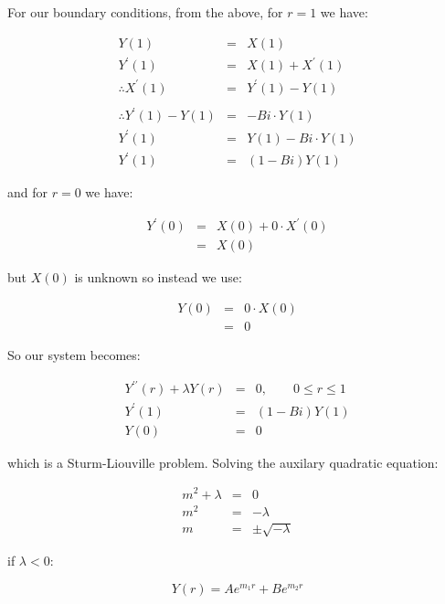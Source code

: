 \documentclass{report}
\begin{document}
For our boundary conditions, from the above, for $r = 1$ we have:\bigskip

\begin{eqnarray*} 
                           Y(1) & = & X(1) \\
                  Y^{\prime}(1) & = & X(1) + X^{\prime}(1) \\
       \therefore X^{\prime}(1) & = & Y^{\prime}(1) - Y(1) \\\\
\therefore Y^{\prime}(1) - Y(1) & = & -Bi \cdot Y(1) \\
                  Y^{\prime}(1) & = & Y(1) - Bi \cdot Y(1) \\
                  Y^{\prime}(1) & = & (1 - Bi)Y(1)
\end{eqnarray*}\medskip

and for $r = 0$ we have:\bigskip

\begin{eqnarray*} 
Y^{\prime}(0) & = & X(0) + 0 \cdot X^{\prime}(0) \\
              & = & X(0) 
\end{eqnarray*}\medskip

but $X(0)$ is unknown so instead we use:\bigskip

\begin{eqnarray*} 
Y(0) & = & 0 \cdot X(0) \\ 
     & = & 0 
\end{eqnarray*}\medskip

So our system becomes:\bigskip

\begin{eqnarray*} 
Y^{\prime\prime}(r) + \lambda Y(r) & = & 0, \qquad 0 \leq r \leq 1 \\
                     Y^{\prime}(1) & = & (1 - Bi)Y(1) \\
                              Y(0) & = & 0 
\end{eqnarray*}\medskip

which is a Sturm-Liouville problem. Solving the auxilary quadratic equation:\bigskip

\begin{eqnarray*} 
m^2 + \lambda & = & 0 \\
          m^2 & = & -\lambda \\
            m & = & \pm \sqrt{-\lambda} 
\end{eqnarray*}\medskip

if $\lambda < 0$:\bigskip

\[
Y(r) = A e^{m_1r} + B e^{m_2r}
\]\medskip
\end{document}
